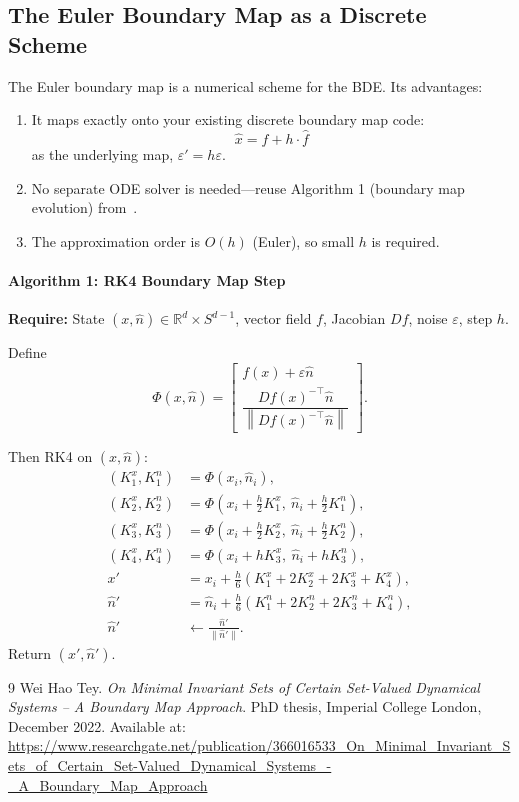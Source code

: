 \documentclass[11pt]{article}
\begin{document}
\subsection{The Euler Boundary Map as a Discrete Scheme}
The Euler boundary map is a numerical scheme for the BDE. Its advantages:
\begin{enumerate}
\item It maps exactly onto your existing discrete boundary map code:
\[
\hat x = f + h\cdot \hat f
\]
as the underlying map, \(\varepsilon' = h\varepsilon\).
\item No separate ODE solver is needed---reuse Algorithm 1 (boundary map evolution) from~\cite{tey2023}.
\item The approximation order is \(O(h)\) (Euler), so small \(h\) is required.
\end{enumerate}
\paragraph{Algorithm 1: RK4 Boundary Map Step}
\textbf{Require:} State \((x,\hat n)\in \mathbb{R}^d\times S^{d-1}\), vector field \(f\), Jacobian \(Df\), noise \(\varepsilon\), step \(h\).

Define
\[
\Phi(x,\hat n)=
\begin{bmatrix}
f(x)+\varepsilon \hat n\\[2mm]
\dfrac{Df(x)^{-\top}\hat n}{\left\|Df(x)^{-\top}\hat n\right\|}
\end{bmatrix}.
\]

Then RK4 on \((x,\hat n)\):
\[
\begin{aligned}
(K_1^x,K_1^n)&=\Phi(x_i,\hat n_i),\\
(K_2^x,K_2^n)&=\Phi\!\left(x_i+\frac{h}{2}K_1^x,\ \hat n_i+\frac{h}{2}K_1^n\right),\\
(K_3^x,K_3^n)&=\Phi\!\left(x_i+\frac{h}{2}K_2^x,\ \hat n_i+\frac{h}{2}K_2^n\right),\\
(K_4^x,K_4^n)&=\Phi\!\left(x_i+hK_3^x,\ \hat n_i+hK_3^n\right),\\[1mm]
x'&=x_i+\frac{h}{6}\left(K_1^x+2K_2^x+2K_3^x+K_4^x\right),\\
\hat n'&=\hat n_i+\frac{h}{6}\left(K_1^n+2K_2^n+2K_3^n+K_4^n\right),\\
\hat n'&\leftarrow \frac{\hat n'}{\|\hat n'\|}.
\end{aligned}
\]
Return \((x',\hat n')\).

\begin{thebibliography}{9}
Wei Hao Tey.
\textit{On Minimal Invariant Sets of Certain Set-Valued Dynamical Systems -- A Boundary Map Approach}.
PhD thesis, Imperial College London, December 2022. Available at: \url{https://www.researchgate.net/publication/366016533_On_Minimal_Invariant_Sets_of_Certain_Set-Valued_Dynamical_Systems_-_A_Boundary_Map_Approach}
\end{thebibliography}
\end{document}
